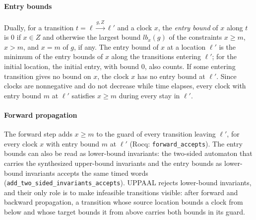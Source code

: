 \paragraph{Entry bounds}
Dually, for a transition $t=\ell\xrightarrow{g,Z}\ell'$ and a clock $x$, the
\emph{entry bound} of $x$ along $t$ is $0$ if $x\in Z$ and otherwise the
largest bound $\mathit{lb}_x(g)$ of the constraints $x\ge m$, $x>m$, and $x=m$
of $g$, if any.  The entry bound of $x$ at a location $\ell'$ is the minimum of
the entry bounds of $x$ along the transitions entering $\ell'$; for the initial
location, the initial entry, with bound $0$, also counts.  If some entering
transition gives no bound on $x$, the clock $x$ has no entry bound at $\ell'$.
Since clocks are nonnegative and do not decrease while time elapses, every
clock with entry bound $m$ at $\ell'$ satisfies $x\ge m$ during every stay in
$\ell'$.

\paragraph{Forward propagation}
The forward step adds $x\ge m$ to the guard of every transition leaving
$\ell'$, for every clock $x$ with entry bound $m$ at $\ell'$ (Rocq:
\texttt{forward\_\allowbreak{}accepts}).  The entry bounds can also be read as lower-bound
invariants: the two-sided automaton that carries the synthesized upper-bound
invariants and the entry bounds as lower-bound invariants accepts the same
timed words (\texttt{add\_\allowbreak{}two\_\allowbreak{}sided\_\allowbreak{}invariants\_\allowbreak{}accepts}).  UPPAAL
rejects lower-bound invariants, and their only role is to make infeasible
transitions visible: after forward and backward propagation, a transition whose
source location bounds a clock from below and whose target bounds it from above
carries both bounds in its guard.


